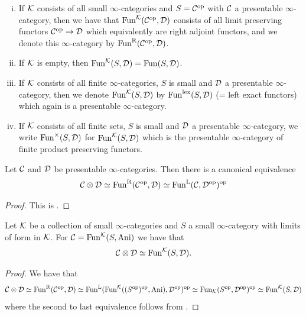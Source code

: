 \begin{example}\label{ex:cont-fun-cats}
\begin{enumerate}[(i)]
    \item If $\mathcal{K}$ consists of all small $\infty$-categories and $S=\mathcal{C}^{\mathrm{op}}$ with $\mathcal{C}$ a presentable $\infty$-category,
            then we have that $\operatorname{Fun}^{\mathcal{K}}(\mathcal{C}^{\mathrm{op}},\mathcal{D})$ consists of all limit preserving functors $\mathcal{C}^{\mathrm{op}}\to\mathcal{D}$
            which equivalently are right adjoint functors, and we denote this $\infty$-category by $\operatorname{Fun}^{\mathrm{R}}(\mathcal{C}^{\mathrm{op}},\mathcal{D})$.
    \item If $\mathcal{K}$ is empty, then $\operatorname{Fun}^{\mathcal{K}}(S,\mathcal{D}) = \operatorname{Fun}(S,\mathcal{D})$.
    \item If $\mathcal{K}$ consists of all finite $\infty$-categories, $S$ is small and $\mathcal{D}$ a presentable $\infty$-category,
            then we denote $\operatorname{Fun}^{\mathcal{K}}(S,\mathcal{D})$ by $\operatorname{Fun}^\mathrm{lex}(S,\mathcal{D})$ (= left exact functors)
            which again is a presentable $\infty$-category.
    \item If $\mathcal{K}$ consists of all finite sets, $S$ is small and $\mathcal{D}$ a presentable $\infty$-category,
            we write $\operatorname{Fun}^\times(S,\mathcal{D})$ for $\operatorname{Fun}^{\mathcal{K}}(S,\mathcal{D})$ which is the presentable $\infty$-category of finite product preserving functors.            
\end{enumerate}
\end{example}

\begin{proposition}\label{prop:pres-tens-prod}
Let $\mathcal{C}$ and $\mathcal{D}$ be presentable $\infty$-categories.
Then there is a canonical equivalence
\[
    \mathcal{C}\otimes\mathcal{D} \simeq \operatorname{Fun}^{\mathrm{R}}(\mathcal{C}^{\mathrm{op}},\mathcal{D}) \simeq \operatorname{Fun}^{\mathrm{L}}(\mathcal{C},\mathcal{D}^{\mathrm{op}})^{\mathrm{op}}
\]
\end{proposition}

\begin{proof}
This is \cite[Proposition 4.8.1.17]{Lurie2017}.
\end{proof}


\begin{corollary}\label{cor:pres-tens-prod}
Let $\mathcal{K}$ be a collection of small $\infty$-categories and $S$ a small $\infty$-category with limits of form in $\mathcal{K}$.
For $\mathcal{C} = \operatorname{Fun}^{\mathcal{K}}(S,\mathrm{Ani})$ we have that
\[
    \mathcal{C}\otimes\mathcal{D} \simeq \operatorname{Fun}^{\mathcal{K}}(S,\mathcal{D}).
\]
\end{corollary}

\begin{proof}
We have that
\[
    \mathcal{C}\otimes\mathcal{D}\simeq\operatorname{Fun}^{\mathrm{R}}(\mathcal{C}^{\mathrm{op}},\mathcal{D})\simeq\operatorname{Fun}^{\mathrm{L}}(\operatorname{Fun}^{\mathcal{K}}((S^{\mathrm{op}})^{\mathrm{op}},\mathrm{Ani}),\mathcal{D}^{\mathrm{op}})^{\mathrm{op}}\simeq\operatorname{Fun}_{\mathcal{K}}(S^{\mathrm{op}},\mathcal{D}^{\mathrm{op}})^{\mathrm{op}}\simeq\operatorname{Fun}^{\mathcal{K}}(S,\mathcal{D})
\]
where the second to last equivalence follows from \cite[Theorem 5.3.6.2]{Lurie2009}.
\end{proof}

